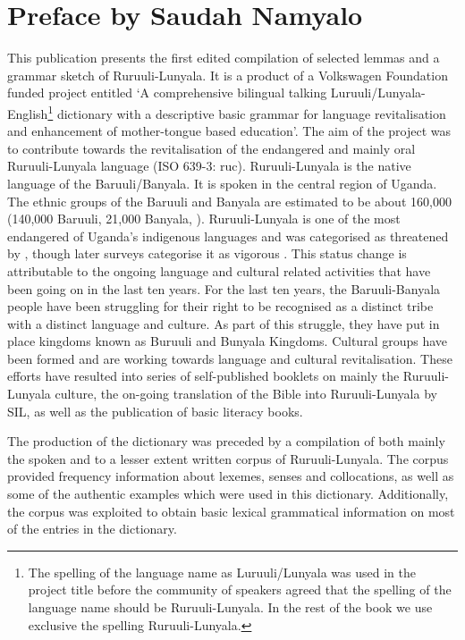 \addchap{\lsPrefaceTitle}
\section*{Preface by Saudah Namyalo}\label{sec-preface}
This publication presents the first edited compilation of selected lemmas and a grammar sketch of Ru\-ruu\-li\hyp{}Lu\-nya\-la. 
It is a product of a Volkswagen Foundation funded project entitled ‘A comprehensive bilingual talking Luruuli/Lunyala-English\footnote{The spelling of the language name as Luruuli/Lunyala was used in the project title before the community of speakers agreed that the spelling of the language name should be Ru\-ruu\-li\hyp{}Lu\-nya\-la. 
In the rest of the book we use exclusive the spelling Ru\-ruu\-li\hyp{}Lu\-nya\-la.} dictionary with a descriptive basic grammar for language revitalisation and enhancement of mother-tongue based education’.
The aim of the project was to contribute towards the revitalisation of the endangered and mainly oral Ru\-ruu\-li\hyp{}Lu\-nya\-la language (ISO 639-3: ruc). 
Ru\-ruu\-li\hyp{}Lu\-nya\-la is the native language of the Baruuli/Banyala. 
It is spoken in the central region of Uganda. 
The ethnic groups of the Baruuli and Banyala are estimated to be about 160,000 (140,000 Baruuli, 21,000 Banyala, \citealt{Uganda2016National}). 
Ruruuli-Lunyala is one of the most endangered of Uganda’s indigenous languages and was categorised as threatened by \citet{ethnologue2016}, though later surveys categorise it as vigorous \citep{ethnologue2019, ethnologue2020}.
This status change is attributable to the ongoing language and cultural related activities that have been going on in the last ten years. 
For the last ten years, the Baruuli-Banyala people have been struggling for their right to be recognised as a distinct tribe with a distinct language and culture. 
 As part of this struggle, they have put in place kingdoms known as Buruuli and Bunyala Kingdoms. 
Cultural groups have been formed and are working towards language and cultural revitalisation. %
 These efforts have resulted into series of self-published booklets on mainly the Ru\-ruu\-li\hyp{}Lu\-nya\-la culture, the on-going translation of the Bible into Ru\-ruu\-li\hyp{}Lu\-nya\-la by SIL, as well as the publication of basic literacy books.

The production of the dictionary was preceded by a compilation of both mainly the spoken and to a lesser extent written corpus of Ru\-ruu\-li\hyp{}Lu\-nya\-la. 
The corpus provided frequency information about lexemes, senses and collocations, as well as some of the authentic examples which were used in this dictionary. 
Additionally, the corpus was exploited to obtain basic lexical grammatical information on most of the entries in the dictionary. 

